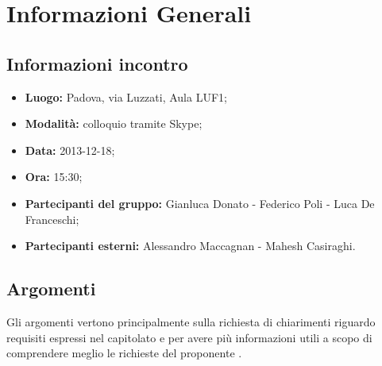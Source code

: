 \section{Informazioni Generali}
	\subsection{Informazioni incontro}
	\begin{itemize}
		\item {\bfseries Luogo:} Padova, via Luzzati, Aula LUF1;
		\item {\bfseries Modalità:} colloquio tramite Skype;
		\item {\bfseries Data:} 2013-12-18;
		\item {\bfseries Ora:} 15:30;
		\item {\bfseries Partecipanti del gruppo:} Gianluca Donato - Federico Poli - Luca De Franceschi;
		\item {\bfseries Partecipanti esterni:} Alessandro Maccagnan - Mahesh Casiraghi.
	\end{itemize}
	
	\subsection{Argomenti}
		Gli argomenti vertono principalmente sulla richiesta di chiarimenti riguardo requisiti espressi nel capitolato e per avere più informazioni utili a scopo di comprendere meglio le richieste del proponente \Proponente{}.